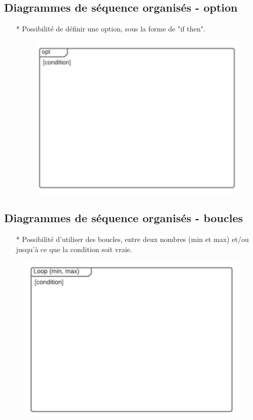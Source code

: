 \documentclass[12pt]{article}
\begin{document}
\subsection{Diagrammes de séquence organisés - option}
\begin{itemize}
	\item[* ] Possibilité de définir une option, sous la forme de "if then".
	\begin{figure}[!hbtp]
		\centering
		\includegraphics[scale=0.75]{Capture5.PNG}
	\end{figure}
\end{itemize}
\subsection{Diagrammes de séquence organisés - boucles}
\begin{itemize}
	\item[*] Possibilité d'utiliser des boucles, entre deux nombres (min et max) et/ou jusqu'à ce que
	la condition soit vraie.
\end{itemize}
\newpage
\begin{figure}[!hbtp]
	\centering
	\includegraphics[scale=0.75]{Capture6.PNG}
\end{figure}
\end{document}
